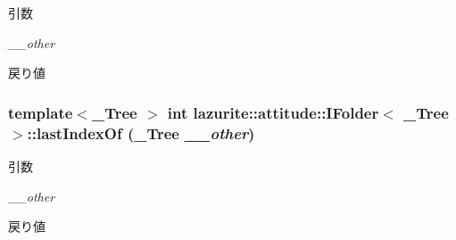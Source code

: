 \begin{DoxyParams}{引数}
\item[{\em \_\-\_\-other}]\end{DoxyParams}
\begin{DoxyReturn}{戻り値}

\end{DoxyReturn}
\hypertarget{interfacelazurite_1_1attitude_1_1_i_folder_3_01___tree_01_4_aa24b999a1c80aab051494a1c668b739e}{
\subsubsection[{lastIndexOf}]{\setlength{\rightskip}{0pt plus 5cm}template$<$\_\-Tree $>$ int lazurite::attitude::IFolder$<$ \_\-Tree $>$::lastIndexOf (\_\-Tree {\em \_\-\_\-other})}}
\label{interfacelazurite_1_1attitude_1_1_i_folder_3_01___tree_01_4_aa24b999a1c80aab051494a1c668b739e}

\begin{DoxyParams}{引数}
\item[{\em \_\-\_\-other}]\end{DoxyParams}
\begin{DoxyReturn}{戻り値}

\end{DoxyReturn}


